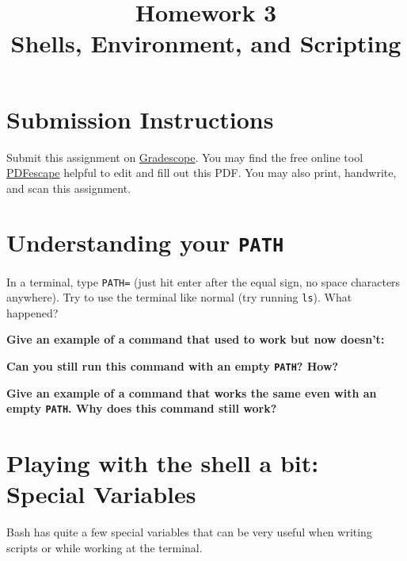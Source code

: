 \documentclass{article}
\begin{document}
\fancyhead[L]{}
\fancyhead[R]{}

\fancyfoot[C]{\color{gray} \thepage~/~\pageref*{LastPage}}
\pagestyle{fancyplain}

\title{\textbf{Homework 3\\Shells, Environment, and Scripting}}
\author{\textbf{\color{red}{Due: Wednesday, October 4th, 11:59PM (Hard Deadline)}}}
\date{}
\maketitle


\section*{Submission Instructions}
Submit this assignment on \href{https://gradescope.com/courses/9999}{Gradescope}.
You may find the free online tool \href{https://www.pdfescape.com}{PDFescape}
helpful to edit and fill out this PDF.
You may also print, handwrite, and scan this assignment.


\section{Understanding your \texttt{PATH}}

In a terminal, type \texttt{PATH=} (just hit enter after the equal sign, no
space characters anywhere). Try to use the terminal like normal (try running
\texttt{ls}). What happened?

\textbf{Give an example of a command that used to work but now doesn't:}
\vspace{1.5cm}

\textbf{Can you still run this command with an empty \texttt{PATH}? How?}
\vspace{1.5cm}

\textbf{Give an example of a command that works the same even with an empty
\texttt{PATH}. Why does this command still work?}
\vspace{1.5cm}


\section{Playing with the shell a bit: Special Variables}

Bash has quite a few special variables that can be very useful when writing
scripts or while working at the terminal.
\end{document}
